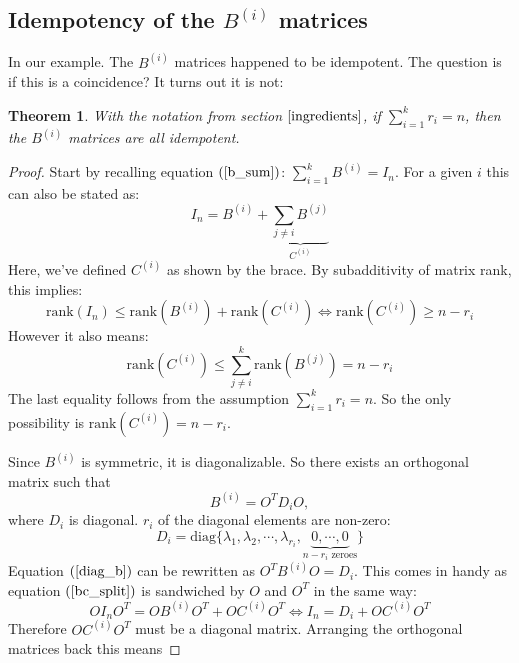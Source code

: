\documentclass[12pt, a4paper]{article}
\newtheorem{theorem}{Theorem}
\begin{document}
\subsection{Idempotency of the $B^{(i)}$ matrices}
In our example. The $B^{(i)}$ matrices happened to be idempotent. The question is if this is a coincidence? It turns out it is not:
\begin{theorem}
\label{b_idempotent}
With the notation from section $\ref{ingredients}$, if $\sum_{i=1}^k r_i=n$, then the $B^{(i)}$ matrices are all idempotent.
\end{theorem}
\begin{proof}
Start by recalling equation $(\ref{b_sum})$: $\sum_{i=1}^k B^{(i)}=I_n$. For a given $i$ this can also be stated as:
\begin{equation}
\label{bc_split}
I_n=B^{(i)} + \underbrace{\sum_{j\neq i}B^{(j)}}_{C^{(i)}}
\end{equation}
Here, we've defined $C^{(i)}$ as shown by the brace. By subadditivity of matrix rank, this implies:
\begin{equation}
\textrm{rank}(I_n)\le\textrm{rank}(B^{(i)})+\textrm{rank}(C^{(i)})\Leftrightarrow \textrm{rank}(C^{(i)})\ge n-r_i
\end{equation}
However it also means:
\begin{equation}
\textrm{rank}(C^{(i)})\le\sum_{j\neq i}^k\textrm{rank}(B^{(j)})=n-r_i
\end{equation}
The last equality follows from the assumption $\sum_{i=1}^k r_i=n$. So the only possibility is $\textrm{rank}(C^{(i)})=n-r_i$.\par
Since $B^{(i)}$ is symmetric, it is diagonalizable. So there exists an orthogonal matrix such that
\begin{equation}
\label{diag_b}
B^{(i)}=O^T D_iO,
\end{equation}
where $D_i$ is diagonal. $r_i$ of the diagonal elements are non-zero:
\begin{equation}
D_i=\textrm{diag}\{\lambda_1,\lambda_2,\cdots,\lambda_{r_i},\underbrace{0,\cdots,0}_{n-r_i\textrm{ zeroes}}\}
\end{equation}
Equation $(\ref{diag_b})$ can be rewritten as $O^T B^{(i)}O=D_i$. This comes in handy as equation $(\ref{bc_split})$ is sandwiched by $O$ and $O^T$ in the same way:
\begin{equation}
OI_n O^T=O B^{(i)}O^T+O C^{(i)}O^T\Leftrightarrow I_n = D_i + O C^{(i)}O^T
\end{equation}
Therefore $OC^{(i)}O^T$ must be a diagonal matrix. Arranging the orthogonal matrices back this means

\end{proof}
\end{document}
